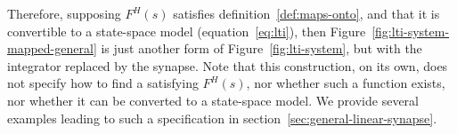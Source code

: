 Therefore, supposing $F^{H}(s)$ satisfies definition~\ref{def:maps-onto}, and that it is convertible to a state-space model (equation~\ref{eq:lti}), then Figure~\ref{fig:lti-system-mapped-general} is just another form of Figure~\ref{fig:lti-system}, but with the integrator replaced by the synapse.
Note that this construction, on its own, does not specify how to find a satisfying $F^{H}(s)$, nor whether such a function exists, nor whether it can be converted to a state-space model.
We provide several examples leading to such a specification in section~\ref{sec:general-linear-synapse}.

